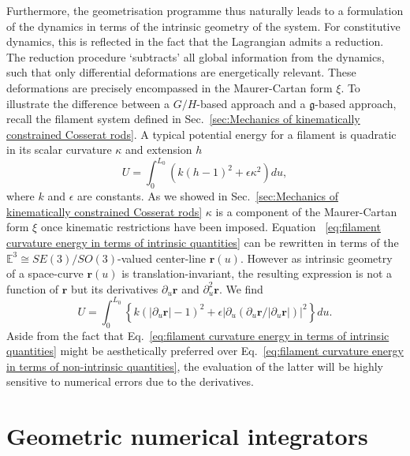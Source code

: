 Furthermore, the geometrisation programme thus naturally leads to a formulation of the dynamics in terms of the intrinsic geometry of the system. For constitutive dynamics, this is reflected in the fact that the Lagrangian admits a reduction. The reduction procedure `subtracts' all global information from the dynamics, such that only differential deformations are energetically relevant. These deformations are precisely encompassed in the Maurer-Cartan form $\xi$. To illustrate the difference between a $G/H$-based approach and a $\mathfrak{g}$-based approach, recall the filament system defined in Sec.~\ref{sec:Mechanics of kinematically constrained Cosserat rods}. A typical potential energy for a filament is quadratic in its scalar curvature $\kappa$ and extension $h$ \citep{sodaDynamicsStiffChains1973, goldsteinNonlinearDynamicsStiff1995}
\begin{equation} \label{eq:filament curvature energy in terms of intrinsic quantities}
U = \int_0^{L_0} (k (h-1)^2 +  \epsilon \kappa^2) du,
\end{equation}
where $k$ and $\epsilon$ are constants. As we showed in Sec.~\ref{sec:Mechanics of kinematically constrained Cosserat rods} $\kappa$ is a component of the Maurer-Cartan form $\xi$ once kinematic restrictions have been imposed. Equation ~\ref{eq:filament curvature energy in terms of intrinsic quantities} can be rewritten in terms of the $\mathbb{E}^3 \cong SE(3)/SO(3)$-valued center-line $\mathbf{r}(u)$. However as intrinsic geometry of a space-curve $\mathbf{r}(u)$ is translation-invariant, the resulting expression is not a function of $\mathbf{r}$ but its derivatives $\partial_u \mathbf{r}$ and $\partial_u^2 \mathbf{r}$. We find
\begin{equation} \label{eq:filament curvature energy in terms of non-intrinsic quantities}
U = \int_0^{L_0} \left\{ k \left( |\partial_u \mathbf{r}| - 1 \right)^2 + \epsilon \left| \partial_u \left( \partial_u \mathbf{r} / |\partial_u \mathbf{r} | \right) \right|^2  \right\} du.
\end{equation}
Aside from the fact that Eq.~\ref{eq:filament curvature energy in terms of intrinsic quantities} might be aesthetically preferred over Eq.~\ref{eq:filament curvature energy in terms of non-intrinsic quantities}, the evaluation of the latter will be highly sensitive to numerical errors due to the derivatives.


\chapter{Geometric numerical integrators} \label{ch:Geometric numerical integrators}

